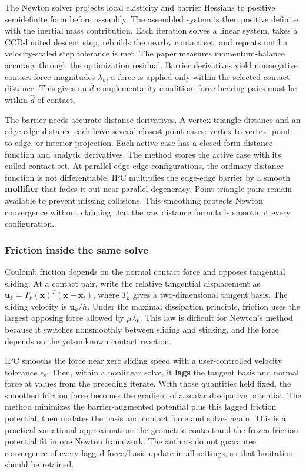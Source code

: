 The Newton solver projects local elasticity and barrier Hessians to positive semidefinite form before assembly. The assembled system is then positive definite with the inertial mass contribution. Each iteration solves a linear system, takes a CCD-limited descent step, rebuilds the nearby contact set, and repeats until a velocity-scaled step tolerance is met. The paper measures momentum-balance accuracy through the optimization residual. Barrier derivatives yield nonnegative contact-force magnitudes \(\lambda_k\); a force is applied only within the selected contact distance. This gives an \(\widehat d\)-complementarity condition: force-bearing pairs must be within \(\widehat d\) of contact.

The barrier needs accurate distance derivatives. A vertex-triangle distance and an edge-edge distance each have several closest-point cases: vertex-to-vertex, point-to-edge, or interior projection. Each active case has a closed-form distance function and analytic derivatives. The method stores the active case with its culled contact set. At parallel edge-edge configurations, the ordinary distance function is not differentiable. IPC multiplies the edge-edge barrier by a smooth \textbf{mollifier} that fades it out near parallel degeneracy. Point-triangle pairs remain available to prevent missing collisions. This smoothing protects Newton convergence without claiming that the raw distance formula is smooth at every configuration.

\subsubsection{Friction inside the same solve}\label{04-visual-computing-ii-ch029-friction-inside-the-same-solve}

Coulomb friction depends on the normal contact force and opposes tangential sliding. At a contact pair, write the relative tangential displacement as \(\mathbf{u}_k=T_k(\mathbf{x})^T(\mathbf{x}-\mathbf{x}_t)\), where \(T_k\) gives a two-dimensional tangent basis. The sliding velocity is \(\mathbf{u}_k/h\). Under the maximal dissipation principle, friction uses the largest opposing force allowed by \(\mu\lambda_k\). This law is difficult for Newton's method because it switches nonsmoothly between sliding and sticking, and the force depends on the yet-unknown contact reaction.

IPC smooths the force near zero sliding speed with a user-controlled velocity tolerance \(\epsilon_v\). Then, within a nonlinear solve, it \textbf{lags} the tangent basis and normal force at values from the preceding iterate. With those quantities held fixed, the smoothed friction force becomes the gradient of a scalar dissipative potential. The method minimizes the barrier-augmented potential plus this lagged friction potential, then updates the basis and contact force and solves again. This is a practical variational approximation: the geometric contact and the frozen friction potential fit in one Newton framework. The authors do not guarantee convergence of every lagged force/basis update in all settings, so that limitation should be retained.


